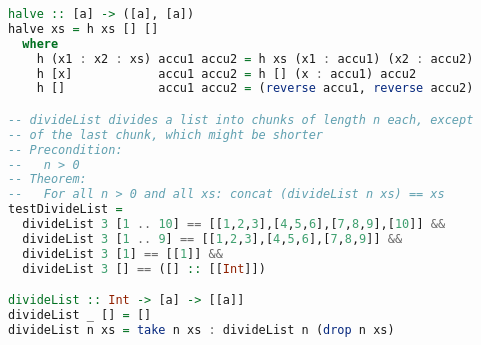 \begin{lstlisting}[language=Haskell]
halve :: [a] -> ([a], [a])
halve xs = h xs [] []
  where
    h (x1 : x2 : xs) accu1 accu2 = h xs (x1 : accu1) (x2 : accu2)
    h [x]            accu1 accu2 = h [] (x : accu1) accu2
    h []             accu1 accu2 = (reverse accu1, reverse accu2)

-- divideList divides a list into chunks of length n each, except
-- of the last chunk, which might be shorter
-- Precondition:
--   n > 0
-- Theorem:
--   For all n > 0 and all xs: concat (divideList n xs) == xs
testDivideList =
  divideList 3 [1 .. 10] == [[1,2,3],[4,5,6],[7,8,9],[10]] &&
  divideList 3 [1 .. 9] == [[1,2,3],[4,5,6],[7,8,9]] &&
  divideList 3 [1] == [[1]] &&
  divideList 3 [] == ([] :: [[Int]])

divideList :: Int -> [a] -> [[a]]
divideList _ [] = []
divideList n xs = take n xs : divideList n (drop n xs)
\end{lstlisting}

\clearpage
